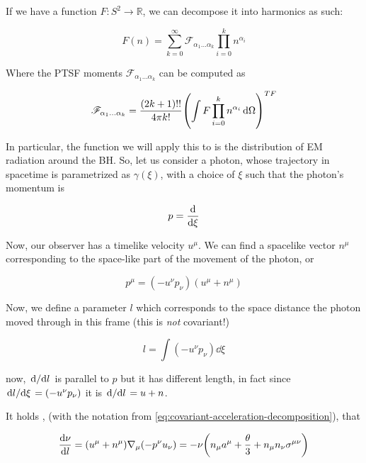 \documentclass[main.tex]{subfiles}
\begin{document}
If we have a function \(F\colon S^2 \rightarrow \mathbb R\), we can decompose it into harmonics as such:

\begin{equation}
    F(n) = \sum _{k=0}   ^{\infty}
    \mathscr F_{\alpha_1 \dots \alpha_k} \prod_{i=0}^k n^{\alpha_i}
\end{equation}

Where the PTSF moments \(\mathscr F_{\alpha_1 \dots \alpha_k}\) can be computed as

\begin{equation}
    \mathscr F_{\alpha_1 \dots \alpha_k} =
    \frac{(2k+1)!!}{4 \pi k!} \qty(\int F \prod_{i=0}^k n^{\alpha_i}  \dd{\Omega}  )^{TF}
\end{equation}

In particular, the function we will apply this to is the distribution of EM radiation around the BH. So, let us consider a photon, whose trajectory in spacetime is parametrized as \(\gamma(\xi)\), with a choice of \(\xi\) such that the photon's momentum is

\begin{equation}
    p = \dv{}{\xi}
\end{equation}

Now, our observer has a timelike velocity \(u^\mu\). We can find a spacelike vector \(n^\mu\) corresponding to the space-like part of the movement of the photon, or

\begin{equation}
    p^\mu = (- u^\nu p_\nu) (u^\mu + n^\mu)
\end{equation}

Now, we define a parameter \(l\) which corresponds to the space distance the photon moved through in this frame (this is \emph{not} covariant!)

\begin{equation}
    l = \int  (-u^\nu p_\nu) \dd{\xi}
\end{equation}

now, \(\dv*{}{l} \) is parallel to \(p\) but it has different length, in fact since \(\dv*{l}{\xi} = (-u^\nu p_\nu) \) it is \(\dv*{}{l} = u + n \).

It holds \cite[eq. 2.17]{Thorne:1981feb}, (with the notation from \eqref{eq:covariant-acceleration-decomposition}),  that

\begin{equation}
  \dv{\nu}{l}  = (u^\mu + n^\mu) \nabla_\mu (-p^\nu u_\nu) = - \nu \qty(n_\mu a^\mu  + \frac{\theta}{3} + n_\mu n_\nu \sigma^{\mu\nu})
\end{equation}
\end{document}
